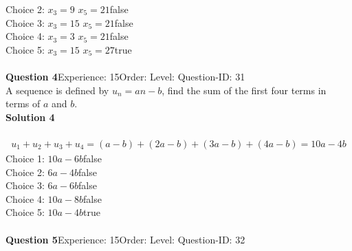 \documentclass{article}
\begin{document}
Choice 2: \hspace{20pt}$x_3=9 \,\, x_5=21$\hspace{20pt}false\\
Choice 3: \hspace{20pt}$x_3=15 \,\, x_5=21$\hspace{20pt}false\\
Choice 4: \hspace{20pt}$x_3=3 \,\, x_5=21$\hspace{20pt}false\\
Choice 5: \hspace{20pt}$x_3=15 \,\, x_5=27$\hspace{20pt}true\\
\\[4pt]
\noindent\textbf{Question 4}\hspace{20pt}Experience: 15\hspace{20pt}Order: \hspace{20pt}Level: \hspace{20pt}Question-ID: 31\\[2pt]
A sequence is defined by $u_n=an-b$, find the sum of the first four terms in terms of $a$ and $b$.\\[4pt]
\noindent\textbf{Solution 4}\\[2pt]
\\[-35pt]\begin{align*}
u_1+u_2+u_3+u_4=(a-b)+(2a-b)+(3a-b)+(4a-b)=10a-4b
\end{align*}
Choice 1: \hspace{20pt}$10a-6b$\hspace{20pt}false\\
Choice 2: \hspace{20pt}$6a-4b$\hspace{20pt}false\\
Choice 3: \hspace{20pt}$6a-6b$\hspace{20pt}false\\
Choice 4: \hspace{20pt}$10a-8b$\hspace{20pt}false\\
Choice 5: \hspace{20pt}$10a-4b$\hspace{20pt}true\\
\\[4pt]
\noindent\textbf{Question 5}\hspace{20pt}Experience: 15\hspace{20pt}Order: \hspace{20pt}Level: \hspace{20pt}Question-ID: 32\\[2pt]
\end{document}
